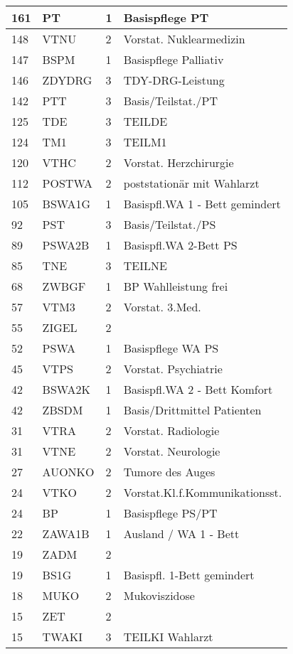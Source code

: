\begin{center}
\begin{longtable}{|p{2.3cm}|p{2.3cm}|p{2.2cm}|p{6cm}|}
161 & PT & 1 & Basispflege PT \\ \hline
148 & VTNU & 2 & Vorstat. Nuklearmedizin \\ \hline
147 & BSPM & 1 & Basispflege Palliativ \\ \hline
146 & ZDYDRG & 3 & TDY-DRG-Leistung \\ \hline
142 & PTT & 3 & Basis/Teilstat./PT \\ \hline
125 & TDE & 3 & TEILDE \\ \hline
124 & TM1 & 3 & TEILM1 \\ \hline
120 & VTHC & 2 & Vorstat. Herzchirurgie \\ \hline
112 & POSTWA & 2 & poststationär mit Wahlarzt \\ \hline
105 & BSWA1G & 1 & Basispfl.WA 1 - Bett gemindert \\ \hline
92 & PST & 3 & Basis/Teilstat./PS \\ \hline
89 & PSWA2B & 1 & Basispfl.WA 2-Bett PS \\ \hline
85 & TNE & 3 & TEILNE \\ \hline
68 & ZWBGF & 1 & BP Wahlleistung frei \\ \hline
57 & VTM3 & 2 & Vorstat. 3.Med. \\ \hline
55 & ZIGEL & 2 &  \\ \hline
52 & PSWA & 1 & Basispflege WA PS \\ \hline
45 & VTPS & 2 & Vorstat. Psychiatrie \\ \hline
42 & BSWA2K & 1 & Basispfl.WA 2 - Bett Komfort \\ \hline
42 & ZBSDM & 1 & Basis/Drittmittel Patienten \\ \hline
31 & VTRA & 2 & Vorstat. Radiologie \\ \hline
31 & VTNE & 2 & Vorstat. Neurologie \\ \hline
27 & AUONKO & 2 & Tumore des Auges \\ \hline
24 & VTKO & 2 & Vorstat.Kl.f.Kommunikationsst. \\ \hline
24 & BP & 1 & Basispflege PS/PT \\ \hline
22 & ZAWA1B & 1 & Ausland / WA 1 - Bett \\ \hline
19 & ZADM & 2 &  \\ \hline
19 & BS1G & 1 & Basispfl. 1-Bett gemindert \\ \hline
18 & MUKO & 2 & Mukoviszidose \\ \hline
15 & ZET & 2 &  \\ \hline
15 & TWAKI & 3 & TEILKI Wahlarzt \\ \hline

\end{longtable}
\end{center}
